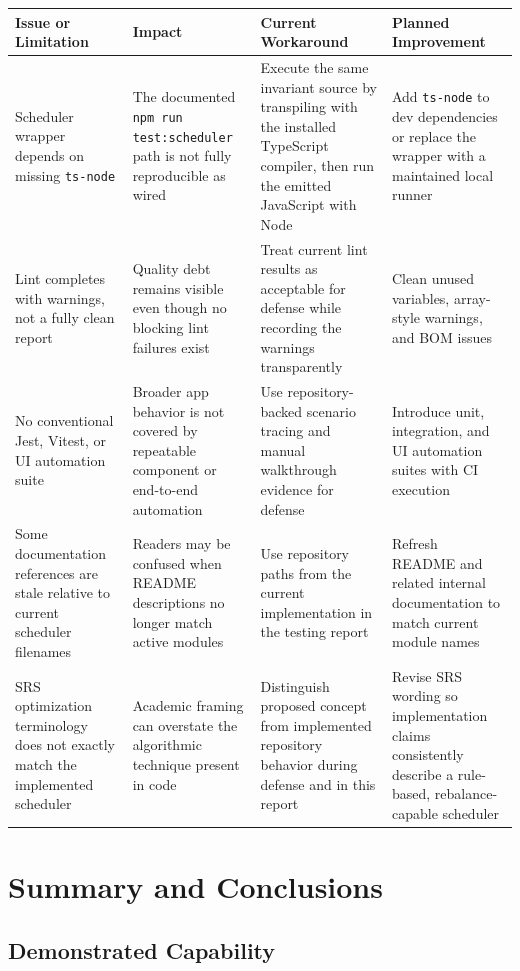 \documentclass[12pt]{article}
\begin{document}
\begin{longtable}{|L{4cm}|L{4cm}|L{3.8cm}|L{3cm}|}
\hline
\textbf{Issue or Limitation} & \textbf{Impact} & \textbf{Current Workaround} & \textbf{Planned Improvement} \\
\hline
Scheduler wrapper depends on missing \texttt{ts-node} & The documented \texttt{npm run test:scheduler} path is not fully reproducible as wired & Execute the same invariant source by transpiling with the installed TypeScript compiler, then run the emitted JavaScript with Node & Add \texttt{ts-node} to dev dependencies or replace the wrapper with a maintained local runner \\
\hline
Lint completes with warnings, not a fully clean report & Quality debt remains visible even though no blocking lint failures exist & Treat current lint results as acceptable for defense while recording the warnings transparently & Clean unused variables, array-style warnings, and BOM issues \\
\hline
No conventional Jest, Vitest, or UI automation suite & Broader app behavior is not covered by repeatable component or end-to-end automation & Use repository-backed scenario tracing and manual walkthrough evidence for defense & Introduce unit, integration, and UI automation suites with CI execution \\
\hline
Some documentation references are stale relative to current scheduler filenames & Readers may be confused when README descriptions no longer match active modules & Use repository paths from the current implementation in the testing report & Refresh README and related internal documentation to match current module names \\
\hline
SRS optimization terminology does not exactly match the implemented scheduler & Academic framing can overstate the algorithmic technique present in code & Distinguish proposed concept from implemented repository behavior during defense and in this report & Revise SRS wording so implementation claims consistently describe a rule-based, rebalance-capable scheduler \\
\hline
\end{longtable}

\newpage

\section{Summary and Conclusions}

\subsection{Demonstrated Capability}
\end{document}
